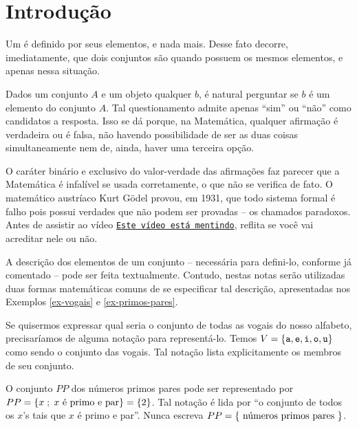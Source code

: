 \section{Introdução}
\label{sec:intro}

Um  é definido por seus elementos, e nada mais.
Desse fato decorre, imediatamente, que dois conjuntos são  quando possuem os mesmos elementos, e apenas nessa situação. 

Dados um conjunto $A$ e um objeto qualquer $b$, é natural perguntar se $b$ é um elemento do conjunto $A$.
Tal questionamento admite apenas ``sim'' ou ``não'' como candidatos a resposta.
Isso se dá porque, na Matemática, qualquer afirmação é verdadeira ou é falsa, não havendo possibilidade de ser as duas coisas simultaneamente nem de, ainda, haver uma terceira opção. 

O caráter binário e exclusivo do valor-verdade das afirmações faz parecer que a Matemática é infalível se usada corretamente, o que não se verifica de fato.
O matemático austríaco Kurt Gödel provou, em 1931, que todo sistema formal é falho pois possui verdades que não podem ser provadas -- os chamados paradoxos.
Antes de assistir ao vídeo \href{https://youtu.be/UI1xR_AECrU}{{\tt Este vídeo está mentindo}}, reflita se você vai acreditar nele ou não.

A descrição dos elementos de um conjunto -- necessária para defini-lo, conforme já comentado -- pode ser feita textualmente.
Contudo, nestas notas serão utilizadas duas formas matemáticas comuns de se especificar tal descrição, apresentadas nos Exemplos \ref{ex-vogais} e \ref{ex-primos-pares}. 

\begin{example}
\label{ex-vogais}
Se quisermos expressar qual seria o conjunto de todas as vogais do nosso alfabeto, precisaríamos de alguma notação para representá-lo. 
Temos $V=\left\{ \texttt{a}, \texttt{e}, \texttt{i}, \texttt{o}, \texttt{u}\right\}$ como sendo o conjunto das vogais. Tal notação lista explicitamente os membros de seu conjunto.
\end{example}

\begin{example}
\label{ex-primos-pares}
O conjunto $PP$ dos números primos pares pode ser representado por $PP = \left\{ x \;;\; x \text{ é primo e par}\right\} = \left\{ 2\right\}$.
Tal notação é lida por ``o conjunto de todos os $x$'s tais que $x$ é primo e par''.
Nunca escreva $PP = \left\{ \text{ números primos pares }\right\}$.
\end{example}

%
